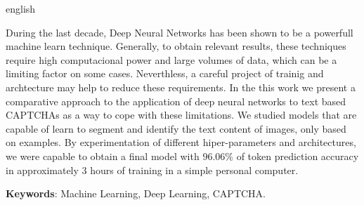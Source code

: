 \begin{resumo}[Abstract]
 \begin{otherlanguage*}{english}
  
During the last decade, Deep Neural Networks has been shown to be a powerfull machine learn technique. Generally, to obtain relevant results, these techniques require high computacional power and large volumes of data, which can be a limiting factor on some cases. Neverthless, a careful project of trainig and archtecture may help to reduce these requirements. In the this work we present a comparative approach to the application of deep neural networks to text based CAPTCHAs as a way to cope with these limitations. We studied models that are capable of learn to segment and identify the text content of images, only based on examples. By experimentation of different hiper-parameters and architectures, we were capable to obtain a final model with $96.06\%$ of token prediction accuracy in approximately 3 hours of training in a simple personal computer.
 
   \vspace{\onelineskip}
 
   \noindent
   \textbf{Keywords}: Machine Learning, Deep Learning, CAPTCHA.
 \end{otherlanguage*}
\end{resumo}